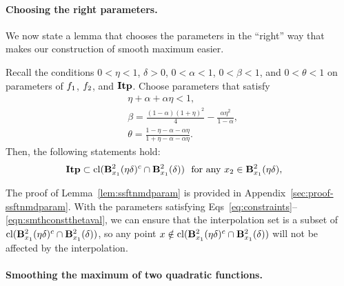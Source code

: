 \paragraph{Choosing the right parameters.}
We now state a lemma that chooses the parameters in the ``right'' way 
that makes our construction of smooth maximum easier.
\begin{lemma}
	\label{lem:ssftnmdparam}
	Recall the conditions $0<\eta<1$, $\delta > 0$, $0<\alpha<1$, $0<\beta<1$, and $0<\theta<1$ on parameters of $f_{1}$, $f_{2}$, and $\mathbf{Itp}$.
	Choose parameters that satisfy
	\begin{align}
		&\eta+\alpha+\alpha\eta < 1,\label{eq:constraints}\\
		&\beta = \frac{(1-\alpha)(1+\eta)^2}{4} - \frac{\alpha \eta^2}{1-\alpha}, \label{eqn:smthconstbetaval}\\
		&\theta = \frac{1-\eta-\alpha-\alpha\eta}{1+\eta-\alpha-\alpha\eta}. \label{eqn:smthconstthetaval}
	\end{align}
	Then, the following statements hold: 
	\begin{align}
		&\itpset \subset \cl(\balltwo{x_1}{\eta\delta}^c \cap \balltwo{x_1}{\delta}) ~\text{ for any } x_2 \in \balltwo{x_1}{\eta\delta}, \label{eqn:itpsubset}%
	\end{align}
\end{lemma}
The proof of Lemma~\ref{lem:ssftnmdparam} is provided in Appendix~\ref{sec:proof-ssftnmdparam}.
With the parameters satisfying Eqs~\eqref{eq:constraints}--\eqref{eqn:smthconstthetaval}, we can ensure that
the interpolation set is a subset of $\cl(\balltwo{x_1}{\eta\delta}^c \cap \balltwo{x_1}{\delta})$,
so any point $x \notin \cl(\balltwo{x_1}{\eta\delta}^c \cap \balltwo{x_1}{\delta})$ will not be affected by the interpolation.

\paragraph{Smoothing the maximum of two quadratic functions.}


